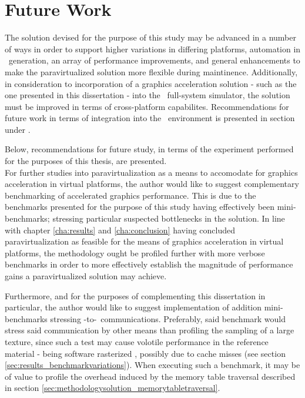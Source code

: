 
\chapter{Future Work}
\label{cha:futurework}
The solution devised for the purpose of this study may be advanced in a number of ways in order to support higher variations in differing platforms, automation in \dvttermabi\ generation, an array of performance improvements, and general enhancements to make the paravirtualized solution more flexible during maintinence.
Additionally, in consideration to incorporation of a graphics acceleration solution - such as the one presented in this dissertation - into the \dvttermsimics\ full-system simulator, the solution must be improved in terms of cross-platform capabilites.
Recommendations for future work in terms of integration into the \dvttermsimics\ environment is presented in section  under .

Below, recommendations for future study, in terms of the experiment performed for the purposes of this thesis, are presented.\\

\noindent
For further studies into paravirtualization as a means to accomodate for graphics acceleration in virtual platforms, the author would like to suggest complementary benchmarking of accelerated graphics performance.
This is due to the benchmarks presented for the purpose of this study having effectively been mini-benchmarks; stressing particular suspected bottlenecks in the solution.
In line with chapter \ref{cha:results} and \ref{cha:conclusion} having concluded paravirtualization as feasible for the means of graphics acceleration in virtual platforms, the methodology ought be profiled further with more verbose benchmarks in order to more effectively establish the magnitude of performance gains a paravirtualized solution may achieve.

Furthermore, and for the purposes of complementing this dissertation in particular, the author would like to suggest implementation of addition mini-benchmarks stressing \dvttermtarget -to-\dvttermhost\ communications.
Preferably, said benchmark would stress said communication by other means than profiling the sampling of a large texture, since such a test may cause volotile performance in the reference material - being software rasterized \dvttermsimics , possibly due to cache misses (see section \ref{sec:results_benchmarkvariations}).
When executing such a benchmark, it may be of value to profile the overhead induced by the memory table traversal described in section \ref{sec:methodologysolution_memorytabletraversal}.\\

